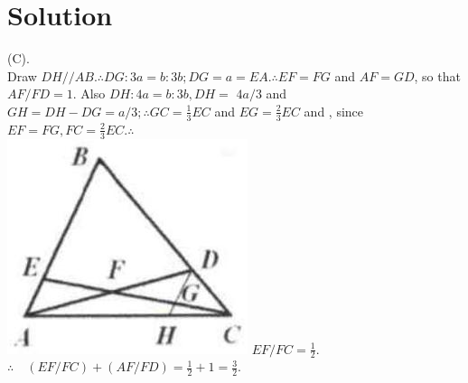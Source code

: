 \documentclass{article}
\begin{document}
\section*{Solution}
(C).\\
Draw \(D H / / A B . \therefore D G: 3 a=b: 3 b ; D G=a=E A . \therefore E F=F G\) and \(A F=G D\), so that \(A F / F D=1\). Also \(D H: 4 a=b: 3 b, D H=\) \(4 a / 3\) and \(G H=D H-D G=a / 3 ; \therefore G C=\frac{1}{3} E C\) and \(E G=\frac{2}{3} E C\) and , since \(E F=F G, F C=\frac{2}{3} E C . \therefore\)\\
\includegraphics[width=\textwidth]{images/133(1).jpg} \(E F / F C=\frac{1}{2}\).\\
\(\therefore \quad(E F / F C)+(A F / F D)=\frac{1}{2}+1=\frac{3}{2}\).\\
\end{document}
